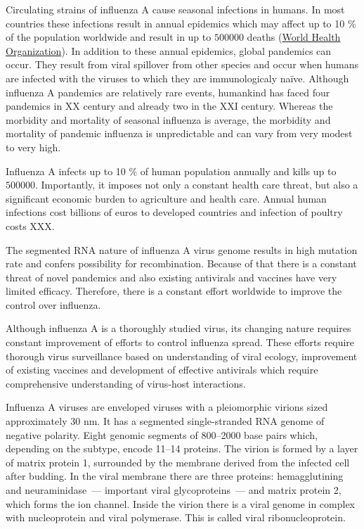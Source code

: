 	Circulating strains of influenza A cause seasonal infections in humans. In most countries these infections result in annual epidemics which may affect up to 10 \% of the population worldwide and result in up to $500000$ deaths (\hyperlink{www.who.in}{World Health Organization}). In addition to these annual epidemics, global pandemics can occur. They result from viral spillover from other species and occur when humans are infected with the viruses to which they are immunologicaly na\"{i}ve. Although influenza A pandemics are relatively rare events, humankind has faced four pandemics in XX century and already two in the XXI century.  Whereas the morbidity and mortality of seasonal influenza is average, the morbidity and mortality of pandemic influenza is unpredictable and can vary from very modest to very high.
	
	Influenza A infects up to 10 \% of human population annually and kills up to $500000$. Importantly, it imposes not only a constant health care threat, but also a significant economic burden to agriculture and health care. Annual human infections cost billions of euros to developed countries and infection of poultry costs XXX. 
	
	The segmented RNA nature of influenza A virus genome results in high mutation rate and confers possibility for recombination. Because of that there is a constant threat of novel pandemics and also existing antivirals and vaccines have very limited efficacy. Therefore, there is a constant effort worldwide to improve the control over influenza. 
	
	Although influenza A is a thoroughly studied virus, its changing nature requires constant improvement of efforts to control influenza spread. These efforts require thorough virus surveillance based on understanding of viral ecology, improvement of existing vaccines and development of effective antivirals which require comprehensive understanding of virus-host interactions.  
	
	Influenza A viruses are enveloped viruses with a pleiomorphic virions sized approximately 30 nm. It has a segmented single-stranded RNA genome of negative polarity. Eight genomic segments of 800--2000 base pairs which, depending on the subtype, encode 11--14 proteins. The virion is formed by a layer of matrix protein 1, surrounded by the membrane derived from the infected cell after budding. In the viral membrane there are three proteins: hemagglutining and neuraminidase~--- important viral glycoproteins~--- and matrix protein 2, which forms the ion channel. Inside the virion there is a viral genome in complex with nucleoprotein and viral polymerase. This is called viral ribonucleoprotein. 
	
